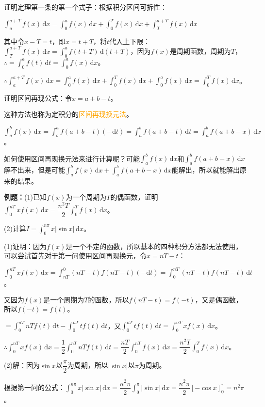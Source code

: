 \documentclass[UTF8, 12pt]{ctexart}
\begin{document}
证明定理第一条的第一个式子：根据积分区间可拆性：

$\int_a^{a+T}f(x)\,\textrm{d}x=\int_0^af(x)\,\textrm{d}x+\int_0^Tf(x)\,\textrm{d}x+\int_T^{a+T}f(x)\,\textrm{d}x$

其中令$x-T=t$，即$x=t+T$，将$t$代入上下限：$\int_T^{a+T}f(x)\,\textrm{d}x=\int_0^af(t+T)\,\textrm{d}(t+T)$，因为$f(x)$是周期函数，周期为$T$，$\therefore=\int_0^af(t)\,\textrm{d}t=\int_0^af(x)\,\textrm{d}x$。

$\therefore\int_a^{a+T}f(x)\,\textrm{d}x=\int_0^af(x)\,\textrm{d}x+\int_0^Tf(x)\,\textrm{d}x+\int_0^af(x)\,\textrm{d}x=\int_0^Tf(x)\,\textrm{d}x$。

证明区间再现公式：令$x=a+b-t$。

这种方法也称为定积分的\textcolor{orange}{区间再现换元法}。

$\int_a^bf(x)\,\textrm{d}x=\int_b^af(a+b-t)(-\textrm{d}t)=\int_a^bf(a+b-t)\,\textrm{d}t=\int_a^bf(a+b-x)\,\textrm{d}x$。

如何使用区间再现换元法来进行计算呢？可能$\int_a^bf(x)\,\textrm{d}x$和$\int_a^bf(a+b-x)\,\textrm{d}x$解不出来，但是可能$\int_a^bf(x)\,\textrm{d}x+\int_a^bf(a+b-x)\,\textrm{d}x$能解出，所以就能解出原来的结果。

\textbf{例题：}(1)已知$f(x)$为一个周期为$T$的偶函数，证明$\int_0^{nT}xf(x)\,\textrm{d}x=\dfrac{n^2T}{2}\int_0^Tf(x)\,\textrm{d}x$。

(2)计算$I=\int_0^{n\pi}x\vert\sin x\vert\,\textrm{d}x$。

(1)证明：因为$f(x)$是一个不定的函数，所以基本的四种积分方法都无法使用，可以尝试首先对于第一问使用区间再现换元，令$x=nT-t$：

$\int_0^{nT}xf(x)\,\textrm{d}x=\int_{nT}^0(nT-t)f(nT-t)(-\textrm{d}t)=\int_0^{nT}(nT-t)f(nT-t)\,\textrm{d}t$。

又因为$f(x)$是一个周期为$T$的函数，所以$f(nT-t)=f(-t)$，又是偶函数，所以$f(-t)=f(t)$。

$=\int_0^{nT}nTf(t)\,\textrm{d}t-\int_0^{nT}tf(t)\,\textrm{d}t$，又$\int_0^{nT}tf(t)\,\textrm{d}t=\int_0^{nT}xf(x)\,\textrm{d}x$。

$\therefore\int_0^{nT}xf(x)\,\textrm{d}x=\dfrac{1}{2}\int_0^{nT}nTf(t)\,\textrm{d}t=\dfrac{nT}{2}\int_0^{nT}f(x)\,\textrm{d}x=\dfrac{n^2T}{2}\int_0^Tf(x)\,\textrm{d}x$。

(2)解：因为$\sin x$以$\dfrac{\pi}{2}$为周期，所以$\vert\sin x\vert$以$\pi$为周期。

根据第一问的公式：$\int_0^{n\pi}x\vert\sin x\vert\,\textrm{d}x=\dfrac{n^2\pi}{2}\int_0^\pi\vert\sin x\vert\,\textrm{d}x=\dfrac{n^2\pi}{2}[-\cos x]_0^\pi=n^2\pi$。
\end{document}

